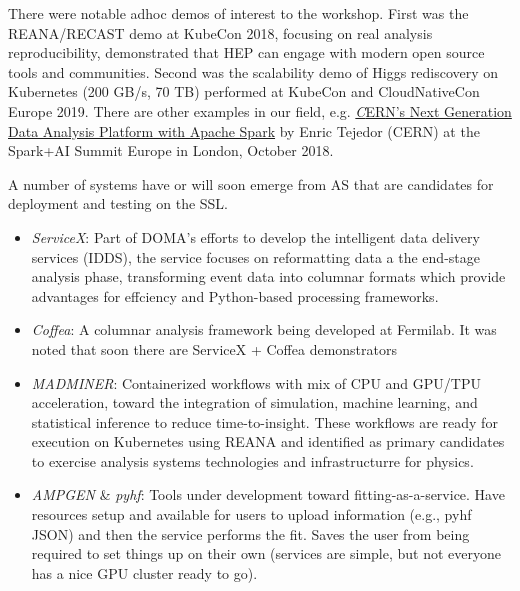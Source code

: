 \documentclass[11pt,letterpaper,fleqn]{article}
\begin{document}
There were notable adhoc demos of interest to the workshop. First was the REANA/RECAST demo at KubeCon 2018, focusing on real analysis reproducibility, demonstrated that HEP can engage with modern open source tools and communities.  Second was the scalability demo of Higgs rediscovery on Kubernetes (200 GB/s, 70 TB) performed at KubeCon and CloudNativeCon Europe 2019.  There are other examples in our field, e.g. \href{https://www.youtube.com/watch?v=Ye8MlJQumaI}{\textit CERN’s Next Generation Data Analysis Platform with Apache Spark} by Enric Tejedor (CERN) at the Spark+AI Summit Europe in London, October 2018.

A number of systems have or will soon emerge from AS that are candidates for deployment and testing on the SSL.

\begin{itemize}
  \item {\it ServiceX}: Part of DOMA's efforts to develop the intelligent data delivery services (IDDS), the service focuses on reformatting data a the end-stage analysis phase, transforming event data into columnar formats which provide advantages for effciency and Python-based processing frameworks.
  \item {\it Coffea}: A columnar analysis framework being developed at Fermilab. It was noted that soon there are ServiceX + Coffea demonstrators
  \item {\it MADMINER}: Containerized workflows with mix of CPU and GPU/TPU acceleration, toward the integration of simulation, machine learning, and statistical inference to reduce time-to-insight. These workflows are ready for execution on Kubernetes using REANA and identified as primary candidates to exercise analysis systems technologies and infrastructurre for physics.
  \item {\it AMPGEN} \& {\it pyhf}: Tools under development toward fitting-as-a-service. Have resources setup and available for users to upload information (e.g., pyhf JSON) and then the service performs the fit. Saves the user from being required to set things up on their own (services are simple, but not everyone has a nice GPU cluster ready to go).
\end{itemize}
\end{document}
